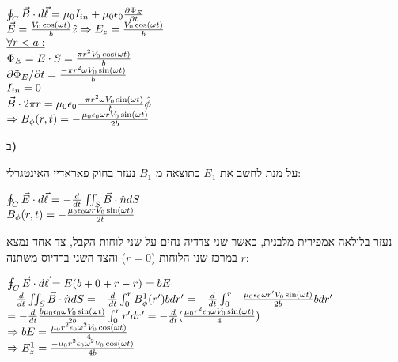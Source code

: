 \documentclass[14pt]{extarticle}
\makeatletter
\newenvironment{lefteqs}{%
    \begin{english}%
    \begin{flushleft}%
    \renewcommand{\arraystretch}{1.3}%
    $\begin{array}{@{}l@{}}%
}{%
    \end{array}$%
    \end{flushleft}%
    \end{english}%
}
\makeatother
\begin{document}
\begin{lefteqs}
    \oint_C \vec{B} \cdot d\vec{\ell} = \mu_0 I_{in} + \mu_0 \epsilon_0 \frac{\partial \Phi_E}{\partial t} \\
    \vec{E} = \frac{V_0 \cos(\omega t)}{b} \hat{z} \Rightarrow E_z = \frac{V_0 \cos(\omega t)}{b} \\
    \underline{\forall r<a:} \\
    \Phi_E = E \cdot S = \frac{\pi r^2 V_0 \cos(\omega t)}{b} \\
    \partial \Phi_E / \partial t = \frac{-\pi r^2 \omega V_0 \sin(\omega t)}{b} \\
    I_{in} = 0 \\
    \vec{B} \cdot 2\pi r = \mu_0 \epsilon_0 \frac{-\pi r^2 \omega V_0 \sin(\omega t)}{b} \hat{\phi} \\
    \Rightarrow B_\phi(r,t) = -\frac{\mu_0 \epsilon_0 \omega r V_0 \sin(\omega t)}{2b}
\end{lefteqs}

\textbf{ב)} 

על מנת לחשב את $E_1$ כתוצאה מ $B_1$ נעזר בחוק פאראדיי האינטגרלי:

\begin{lefteqs}
    \oint_C \vec{E} \cdot d\vec{\ell} = -\frac{d}{dt} \iint_S \vec{B} \cdot \hat{n} dS \\
    B_\phi(r,t) = -\frac{\mu_0 \epsilon_0 \omega r V_0 \sin(\omega t)}{2b} \\
\end{lefteqs}

נעזר בלולאה אמפירית מלבנית, כאשר שני צדדיה נחים על שני לוחות הקבל, צד אחד נמצא במרכז שני הלוחות ($r=0$) והצד השני ברדיוס משתנה $r$:

\begin{lefteqs}
    \oint_C \vec{E} \cdot d\vec{\ell} = E(b+0+r-r) = bE \\
    -\frac{d}{dt} \iint_S \vec{B} \cdot \hat{n} dS = -\frac{d}{dt} \int_0^r B_\phi^1(r') b dr' = -\frac{d}{dt} \int_0^r -\frac{\mu_0 \epsilon_0 \omega r' V_0 \sin(\omega t)}{2b} b dr' \\
    = -\frac{d}{dt} \frac{b\mu_0 \epsilon_0 \omega V_0 \sin(\omega t)}{2b} \int_0^r r' dr' = -\frac{d}{dt} (\frac{\mu_0 r^2 \epsilon_0 \omega V_0 \sin(\omega t)}{4}) \\
    \Rightarrow bE = \frac{\mu_0 r^2 \epsilon_0 \omega^2 V_0 \cos(\omega t)}{4} \\
    \Rightarrow E_z^1 = \frac{-\mu_0 r^2 \epsilon_0 \omega^2 V_0 \cos(\omega t)}{4b}
\end{lefteqs}
\end{document}
